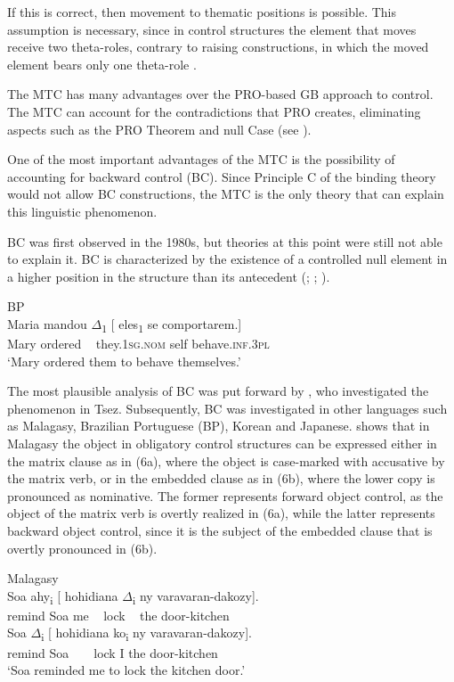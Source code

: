 \documentclass[output=paper]{langsci/langscibook}
\begin{document}
If this is correct, then movement to thematic positions is possible. This assumption is necessary, since in control structures the element that moves receive two theta-roles, contrary to raising constructions, in which the moved element bears only one theta-role \citep{Hornstein1999}.

The MTC has many advantages over the PRO-based GB approach to control. The MTC can account for the contradictions that PRO creates, eliminating aspects such as the PRO Theorem and null Case (see \citealt{Hornstein2001}). 

One of the most important advantages of the MTC is the possibility of accounting for backward control (BC). Since Principle C of the binding theory would not allow BC constructions, the MTC is the only theory that can explain this linguistic phenomenon. 

BC was first observed in the 1980s, but theories at this point were still not able to explain it. BC is characterized by the existence of a controlled null element in a higher position in the structure than its antecedent (\citealt{Farrell1995}; \citealt{Rodrigues2004}; \citealt{Boeckx2006}). 

\ea%
    BP\label{ex:moreno:3}\\
    \gll Maria mandou ${\Delta}$\textsubscript{1} [ eles\textsubscript{1} se comportarem.]  \\
         Mary ordered ~ {} they.\textsc{1sg.nom} self behave.\textsc{inf.3pl}\\
    \glt ‘Mary ordered them to behave themselves.’
    \z

The most plausible analysis of BC was put forward by \citet{Polinsky2002}, who investigated the phenomenon in Tsez. Subsequently, BC was investigated in other languages such as Malagasy, Brazilian Portuguese (BP), Korean and Japanese. \citet{Potsdam2009} shows that in Malagasy the object in obligatory control structures can be expressed either in the matrix clause as in (6a), where the object is case-marked with accusative by the matrix verb, or in the embedded clause as in (6b), where the lower copy is pronounced as nominative. The former represents forward object control, as the object of the matrix verb is overtly realized in (6a), while the latter represents backward object control, since it is the subject of the embedded clause that is overtly pronounced in (6b).

\ea%
    Malagasy \citep[755]{Potsdam2009}\label{ex:moreno:4}\\
    \ea
     Soa  ahy\textsubscript{i} [ hohidiana ${\Delta}$\textsubscript{i}   ny varavaran-dakozy].\\
         remind                 Soa   me   ~ lock ~ the door-kitchen\\
    \ex
     Soa  ${\Delta}$\textsubscript{i}        [ hohidiana ko\textsubscript{i}   ny varavaran-dakozy].\\
         remind                    Soa    ~ ~ lock          I      the door-kitchen\\
    \glt ‘Soa reminded me to lock the kitchen door.’
    \z
\z
\end{document}
